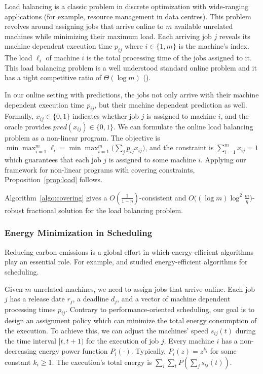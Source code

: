 Load balancing is a classic problem in discrete optimization with wide-ranging applications (for example, resource management in data centres).
This problem revolves around assigning jobs that arrive online to $m$ available unrelated machines while minimizing their maximum load.
Each arriving job $j$ reveals its machine dependent execution time $p_{ij}$ where $i \in \{1, m\}$ is the machine's index. The load $\ell_{i}$ of machine $i$ is the total processing time of the jobs assigned
to it. This load balancing problem is a well understood standard online problem and it has a tight competitive ratio of $\Theta(\log m)$ (\cite{BorodinEl-Yaniv05:Online-computation,Caragiannis08:Better-bounds}).

In our online setting with predictions, the jobs not only arrive with their machine dependent execution time $p_{ij}$, but their machine dependent prediction as well. Formally, $x_{ij} \in \{0,1\}$ indicates whether job $j$ is assigned to machine $i$, and the oracle provides $pred(x_{ij}) \in \{0,1\}$. We can formulate the online load balancing problem as a non-linear program. The objective is $\min \max_{i=1}^{m} \ell_{i} = \min \max_{i=1}^{m} \bigl(\sum_{j} p_{ij} x_{ij}\bigr)$, and the constraint is $\sum_{i=1}^{m} x_{ij} = 1$ which guarantees that each job $j$ is assigned to some machine $i$. Applying our framework for non-linear programs with covering constraints, Proposition~\ref{prop:load} follows.

\begin{proposition} \label{prop:load}
Algorithm~\ref{algo:covering} gives a
$O(\frac{1}{1 - \eta})$-consistent and $O\bigl((\log m) \log^{2} \frac{m}{\eta}\bigr)$-robust fractional solution
for the load balancing problem.
\end{proposition}


\subsubsection{Energy Minimization in Scheduling}

Reducing carbon emissions is a global effort in which energy-efficient algorithms play an essential role. For example, \cite{Albers10:Energy-efficient-algorithms} and \cite{GuCaiZengZhangJinDai:2019} studied energy-efficient algorithms for scheduling.

Given $m$ unrelated machines, we need to assign jobs that arrive online. Each job $j$ has a release date $r_{j}$, a deadline $d_{j}$, and a vector of machine dependent processing times $p_{ij}$. Contrary to performance-oriented scheduling, our goal is to design an assignment policy which can minimize the total energy consumption of the execution. To achieve this, we can adjust the machines' speed $s_{ij}(t)$ during the time interval $[t,t+1)$ for the execution of job $j$. Every machine $i$ has a non-decreasing energy power function $P_{i}(\cdot)$. Typically, $P_{i}(z) = z^{k_{i}}$ for some constant $k_{i} \geq 1$. The execution's total energy is $\sum_{i} \sum_{t} P(\sum_{j} s_{ij}(t))$.

